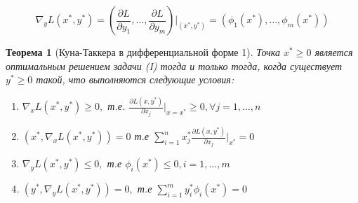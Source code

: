 \documentclass[a4paper]{article}
\newtheorem{theorem}{Теорема}[section]
\theoremstyle{definition}
\theoremstyle{remark}
\begin{document}
\[\nabla_y L(x^*, y^*) = (\frac{\partial L}{\partial y_1}, ..., \frac{\partial L}{\partial y_m})|_{(x^*, y^*)} = (\phi_1(x^*), \dots, \phi_m(x^*))\]
\begin{theorem}[Куна-Таккера в дифференциальной форме 1]
    Точка $x^* \ge 0$ является оптимальным решением задачи (I) тогда  и только тогда, когда существует $y^*\ge 0$ такой, что выполняются следующие условия:
    \begin{enumerate}
        \item $\nabla_x L(x^*, y^*) \ge 0,$ т.е. $\frac{\partial L(x, y^*)}{\partial x_j} |_{x = x^*} \ge 0, \forall j = 1, \dots, n$
        \item $(x^*, \nabla_x L(x^*, y^*)) = 0$ т.е $\sum_{i = 1}^n x^*_j\frac{\partial L(x, y^*)}{\partial x_j}|_{x^*} = 0$
        \item $\nabla_y L(x^*, y^*) \le 0,$ т.е $\phi_i(x^*)\le 0, i = 1, ..., m$
        \item $(y^*, \nabla_y L(x^*, y^*)) = 0, $ т.е $\sum_{i = 1}^{m}y^*_i \phi_i(x^*) = 0$
    \end{enumerate}
\end{theorem}
\end{document}
